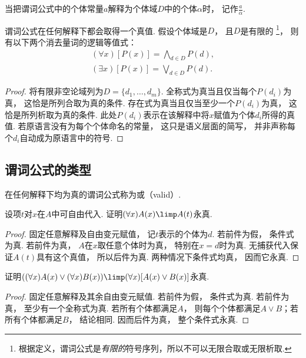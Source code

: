 当把谓词公式中的个体常量\(a\)解释为个体域\(D\)中的个体\(\alpha\)时，
记作\(\frac{a}{\alpha}\).

谓词公式在任何解释下都会取得一个真值.
假设个体域是\(D\)，
且\(D\)是有限的
\footnote{
	根据定义，谓词公式是\emph{有限的}符号序列，所以不可以无限合取或无限析取.
}，
则有以下两个消去量词的逻辑等值式：\begin{gather}
	(\forall x)[P(x)]
	= \bigwedge_{d \in D} P(d), \\
	(\exists x)[P(x)]
	= \bigvee_{d \in D} P(d).
\end{gather}
\begin{proof}
    将有限非空论域列为\(D=\{d_1,\dotsc,d_m\}\).
    全称式为真当且仅当每个\(P(d_i)\)为真，
    这恰是所列合取为真的条件.
    存在式为真当且仅当至少一个\(P(d_i)\)为真，
    这恰是所列析取为真的条件.
    此处\(P(d_i)\)表示在该解释中将\(x\)赋值为个体\(d_i\)所得的真值.
    若原语言没有为每个个体命名的常量，
    这只是语义层面的简写，
    并非声称每个\(d_i\)自动成为原语言中的符号.
\end{proof}

\subsection{谓词公式的类型}
在任何解释下均为真的谓词公式称为或（valid）.

\begin{example}\label{example:数理逻辑.全称实例化}
    设项\(t\)对\(x\)在\(A\)中可自由代入.
    证明\((\forall x)A(x)\limp A(t)\)永真.
    \begin{proof}
        固定任意解释及自由变元赋值，
        记\(t\)表示的个体为\(d\).
        若前件为假，
        条件式为真.
        若前件为真，
        \(A\)在\(x\)取任意个体时为真，
        特别在\(x=d\)时为真.
        无捕获代入保证\(A(t)\)具有这个真值，
        所以后件为真.
        两种情况下条件式均真，
        因而它永真.
    \end{proof}
\end{example}

\begin{example}
    证明\(((\forall x)A(x)\lor(\forall x)B(x))\limp(\forall x)[A(x)\lor B(x)]\)永真.
    \begin{proof}
        固定任意解释及其余自由变元赋值.
        若前件为假，
        条件式为真.
        若前件为真，
        至少有一个全称式为真.
        若所有个体都满足\(A\)，
        则每个个体都满足\(A\lor B\)；若所有个体都满足\(B\)，
        结论相同.
        因而后件为真，
        整个条件式永真.
    \end{proof}
\end{example}

